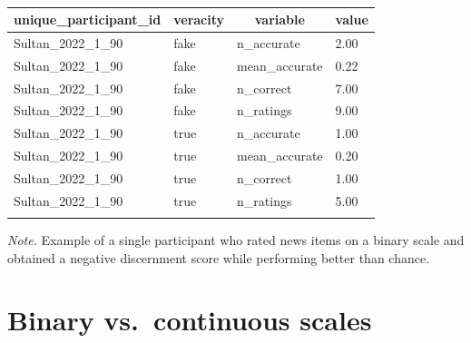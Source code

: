 \documentclass[
  man]{apa6}
\begin{document}
\begin{table}[tbp]

\begin{center}
\begin{threeparttable}

\caption{\label{tab:single-participant-example}}

\begin{tabular}{llll}
\toprule
unique\_participant\_id & \multicolumn{1}{c}{veracity} & \multicolumn{1}{c}{variable} & \multicolumn{1}{c}{value}\\
\midrule
Sultan\_2022\_1\_90 & fake & n\_accurate & 2.00\\
Sultan\_2022\_1\_90 & fake & mean\_accurate & 0.22\\
Sultan\_2022\_1\_90 & fake & n\_correct & 7.00\\
Sultan\_2022\_1\_90 & fake & n\_ratings & 9.00\\
Sultan\_2022\_1\_90 & true & n\_accurate & 1.00\\
Sultan\_2022\_1\_90 & true & mean\_accurate & 0.20\\
Sultan\_2022\_1\_90 & true & n\_correct & 1.00\\
Sultan\_2022\_1\_90 & true & n\_ratings & 5.00\\
\bottomrule
\addlinespace
\end{tabular}

\begin{tablenotes}[para]
\normalsize{\textit{Note.} Example of a single participant who rated news items on a binary scale and obtained a negative discernment score while performing better than chance.}
\end{tablenotes}

\end{threeparttable}
\end{center}

\end{table}

\clearpage

\section{Binary vs.~continuous scales}\label{binary}

\FloatBarrier
\end{document}
